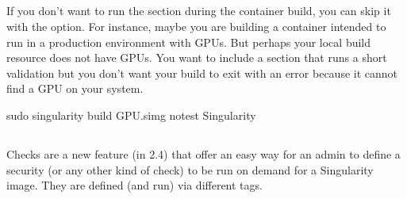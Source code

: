 \documentclass[letterpaper,10pt,english]{sphinxmanual}
\begin{document}
\subsection{}
\label{\detokenize{build_a_container:notest}}
If you don’t want to run the  section during the container build, you can
skip it with the  option. For instance, maybe you are building a
container intended to run in a production environment with GPUs. But
perhaps your local build resource does not have GPUs. You want to
include a  section that runs a short validation but you don’t want your
build to exit with an error because it cannot find a GPU on your system.

%
\begin{sphinxVerbatim}[commandchars=\\\{\}]
\PYGZdl{} sudo singularity build GPU.simg \PYGZhy{}\PYGZhy{}notest Singularity
\end{sphinxVerbatim}


\subsection{}
\label{\detokenize{build_a_container:checks}}
Checks are a new feature (in 2.4) that offer an easy way for an admin
to define a security (or any other kind of check) to be run on demand
for a Singularity image. They are defined (and run) via different
tags.

%
\begin{sphinxVerbatim}[commandchars=\\\{\}]
 

         

                

                

               

               
\end{sphinxVerbatim}
\end{document}
